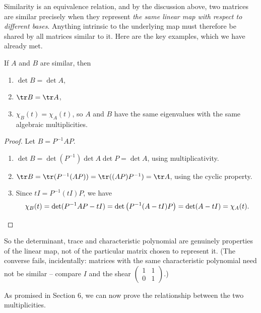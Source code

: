 Similarity is an equivalence relation, and by the discussion above, two matrices are similar precisely when they represent \emph{the same linear map with respect to different bases}. Anything intrinsic to the underlying map must therefore be shared by all matrices similar to it. Here are the key examples, which we have already met.

\begin{proposition}
	If $A$ and $B$ are similar, then
	\begin{enumerate}[label=(\roman*)]
		\item $\det B = \det A$,
		\item $\tr B = \tr A$,
		\item $\chi_B(t) = \chi_A(t)$, so $A$ and $B$ have the same eigenvalues with the same algebraic multiplicities.
	\end{enumerate}
\end{proposition}
\begin{proof}
	Let $B = P^{-1}AP$.
	\begin{enumerate}[label=(\roman*)]
		\item $\det B = \det(P^{-1})\det A \det P = \det A$, using multiplicativity.
		\item $\tr B = \tr(P^{-1}(AP)) = \tr((AP)P^{-1}) = \tr A$, using the cyclic property.
		\item Since $tI = P^{-1}(tI)P$, we have
		$$
		\chi_B(t) = \det(P^{-1}AP - tI) = \det\left(P^{-1}(A - tI)P\right) = \det(A - tI) = \chi_A(t). \qedhere
		$$
	\end{enumerate}
\end{proof}

So the determinant, trace and characteristic polynomial are genuinely properties of the linear map, not of the particular matrix chosen to represent it. (The converse fails, incidentally: matrices with the same characteristic polynomial need not be similar -- compare $I$ and the shear $\begin{pmatrix} 1 & 1 \\ 0 & 1\end{pmatrix}$.)

As promised in Section 6, we can now prove the relationship between the two multiplicities.

